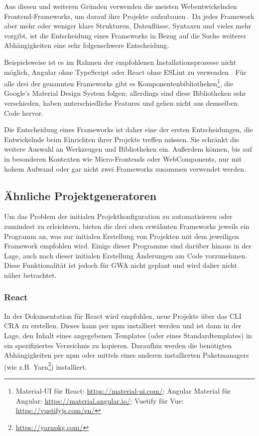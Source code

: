 Aus diesen und weiteren Gründen verwenden die meisten Webentwickelnden Frontend-Frameworks, um darauf ihre Projekte aufzubauen \cite{stateofjs}. Da jedes Framework aber mehr oder weniger klare Strukturen, Datenflüsse, Syntaxen und vieles mehr vorgibt, ist die Entscheidung eines Frameworks in Bezug auf die Suche weiterer Abhängigkeiten eine sehr folgenschwere Entscheidung.

Beispielsweise ist es im Rahmen der empfohlenen Installationsprozesse nicht möglich, Angular ohne TypeScript oder React ohne ESLint zu verwenden \cite{angular_only_with_typescript} \cite{react_eslint}. Für alle drei der genannten Frameworks gibt es Komponentenbibliotheken\footnote{Material-UI für React: \url{https://material-ui.com/}; Angular Material für Angular: \url{https://material.angular.io/}; Vuetify für Vue: \url{https://vuetifyjs.com/en/}}, die Google's Material Design System folgen; allerdings sind diese Bibliotheken sehr verschieden, haben unterschiedliche Features und gehen nicht aus demselben Code hervor.

Die Entscheidung eines Frameworks ist daher eine der ersten Entscheidungen, die Entwickelnde beim Einrichten ihrer Projekte treffen müssen. Sie schränkt die weitere Auswahl an Werkzeugen und Bibliotheken ein. Außerdem können, bis auf in besonderen Kontexten wie Micro-Frontends oder WebComponents, nur mit hohem Aufwand oder gar nicht zwei Frameworks zusammen verwendet werden.

\subsection{Ähnliche Projektgeneratoren}
Um das Problem der initialen Projektkonfiguration zu automatisieren oder zumindest zu erleichtern, bieten die drei oben erwähnten Frameworks jeweils ein Programm an, was zur initialen Erstellung von Projekten mit dem jeweiligen Framework empfohlen wird. Einige dieser Programme sind darüber hinaus in der Lage, auch nach dieser initialen Erstellung Änderungen am Code vorzunehmen. Diese Funktionalität ist jedoch für \gls{GWA} nicht geplant und wird daher nicht näher betrachtet.

\subsubsection{React}
In der Dokumentation für React wird empfohlen, neue Projekte über das \gls{CLI} \gls{CRA} zu erstellen. Dieses kann per \gls{npm} installiert werden und ist dann in der Lage, den Inhalt eines angegebenen Templates (oder eines Standardtemplates) in ein spezifiziertes Verzeichnis zu kopieren. Daraufhin werden die benötigten Abhängigkeiten per \gls{npm} oder mittels eines anderen installierten Paketmanagers (wie z.B. Yarn\footnote{\url{https://yarnpkg.com/}}) installiert.

